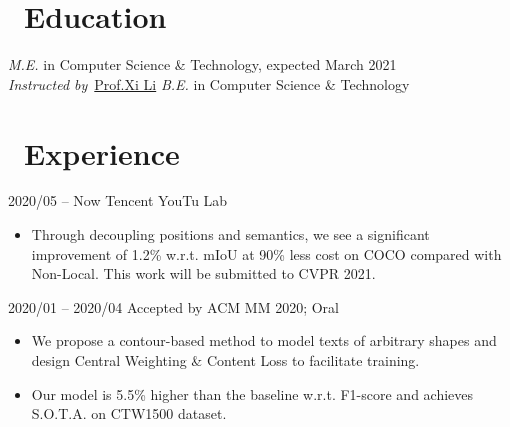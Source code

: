 \documentclass{resume}
\begin{document}

\section{\faGraduationCap\ Education}
\textit{M.E.} in  Computer Science \& Technology, expected March 2021\\
\textit{Instructed by}\ \href{https://person.zju.edu.cn/xilics}{Prof.Xi Li}
\textit{B.E.} in Computer Science \& Technology
\vspace{-0.25em}

\section{\faUsers\ Experience}
 {2020/05 -- Now}
\vspace{-0.3em}
 {Tencent YouTu Lab}
\vspace{-0.5em}
\begin{itemize}
\item Through decoupling positions and semantics, we see a significant improvement of 1.2\% w.r.t. mIoU at 90\% less cost on COCO compared with Non-Local. This work will be submitted to CVPR 2021.
\end{itemize}

 {2020/01 -- 2020/04}
\vspace{-0.3em}
 {Accepted by ACM MM 2020; Oral}
\vspace{-0.5em}
\begin{itemize}
	\item We propose a contour-based method to model texts of arbitrary shapes and design Central Weighting \& Content Loss to facilitate training. 
	\item Our model is 5.5\% higher than the baseline w.r.t. F1-score and achieves S.O.T.A. on CTW1500 dataset.
\end{itemize}
\end{document}
